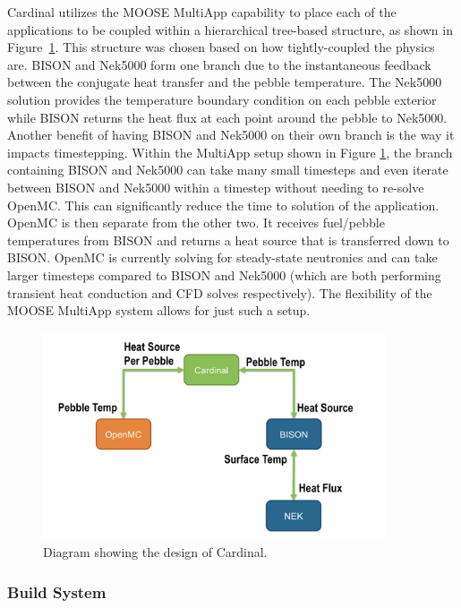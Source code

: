 Cardinal utilizes the MOOSE MultiApp capability to place each of the applications to be coupled within a hierarchical tree-based structure, as shown in Figure~\ref{f:cardinal}. This structure was chosen based on how tightly-coupled the physics are. BISON and Nek5000 form one branch due to the instantaneous feedback between the conjugate heat transfer and the pebble temperature. The Nek5000 solution provides the temperature boundary condition on each pebble exterior while BISON returns the heat flux at each point around the pebble to Nek5000. Another benefit of having BISON and Nek5000 on their own branch is the way it impacts timestepping. Within the MultiApp setup shown in Figure \ref{f:cardinal}, the branch containing BISON and Nek5000 can take many small timesteps and even iterate between BISON and Nek5000 within a timestep without needing to re-solve OpenMC. This can significantly reduce the time to solution of the application. OpenMC is then separate from the other two. It receives fuel/pebble temperatures from BISON and returns a heat source that is transferred down to BISON. OpenMC is currently solving for steady-state neutronics and can take larger timesteps compared to BISON and Nek5000 (which are both performing transient heat conduction and CFD solves respectively). The flexibility of the MOOSE MultiApp system allows for just such a setup.

\begin{figure}[!h]
\centering
\includegraphics[clip=true,width=0.9\textwidth]{Figures/cardinal}
\caption{Diagram showing the design of Cardinal.}
\label{f:cardinal}
\end{figure}

\subsubsection{Build System}
\label{ss:c2}

